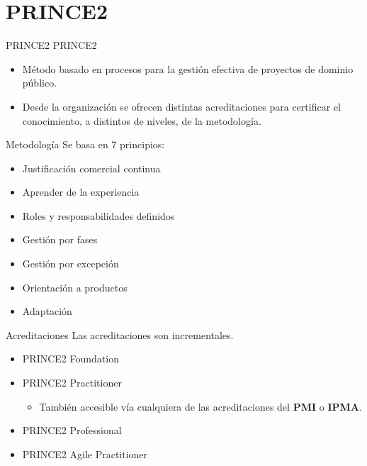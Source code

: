 \section{PRINCE2}
\begin{frame}[allowframebreaks]{PRINCE2}
	PRINCE2 
	\begin{itemize}
		\item Método basado en procesos para la gestión efectiva de proyectos de dominio público.
		\item Desde la organización se ofrecen distintas acreditaciones para certificar el conocimiento, a distintos de niveles, de la metodología.
	\end{itemize}
	
	\framebreak
	
	\begin{block}{Metodología}
		Se basa en 7 principios:
		\begin{itemize}
			\item Justificación comercial continua
			\item Aprender de la experiencia
			\item Roles y responsabilidades definidos
			\item Gestión por fases
			\item Gestión por excepción
			\item Orientación a productos
			\item Adaptación
		\end{itemize}
	\end{block}
	
	\framebreak
	
	\begin{block}{Acreditaciones}
		Las acreditaciones son incrementales.
		\begin{itemize}
			\item PRINCE2 Foundation
			\item PRINCE2 Practitioner
			\begin{itemize}
				\item También accesible vía cualquiera de las acreditaciones del \textbf{PMI} o \textbf{IPMA}.
			\end{itemize}
			\item PRINCE2 Professional
			\item PRINCE2 Agile Practitioner
		\end{itemize}
	\end{block}
\end{frame}